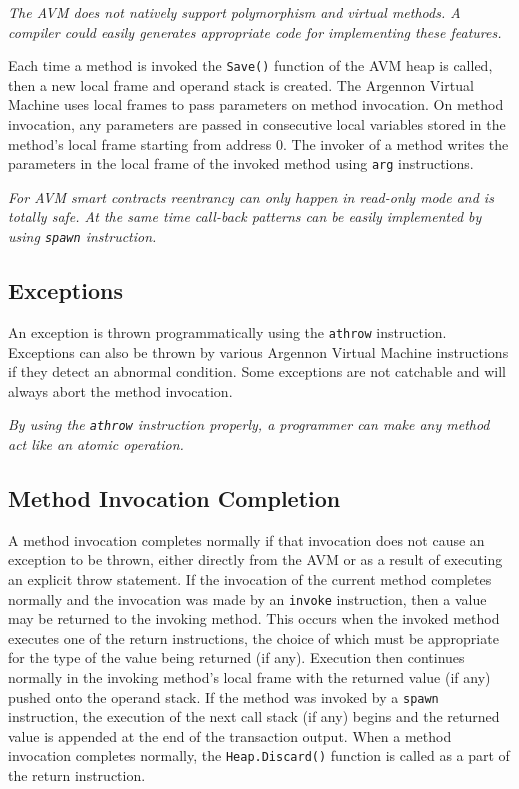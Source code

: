 \documentclass[11pt, a4paper]{report}
\newcommand{\note}[1] {
    \begin{tcolorbox}[colframe=white,colback=white]
        \emph{#1}
    \end{tcolorbox}
}
\begin{document}
    \note{The AVM does not natively support polymorphism and virtual methods. A compiler could easily
    generates appropriate code for implementing these features.}

    Each time a method is invoked the \texttt{Save()} function of the AVM heap is called, then a new local frame
    and operand stack is created. The Argennon Virtual Machine uses local frames to pass parameters on
    method invocation. On method invocation, any parameters are passed in consecutive local variables stored in the
    method's local frame starting from address 0. The invoker of a method writes the parameters in the local frame
    of the invoked method using \texttt{arg} instructions.

    \note{For AVM smart contracts \emph{reentrancy} can only happen in read-only mode and is totally safe.
    At the same time call-back patterns can be easily implemented by using \texttt{spawn} instruction.}

    \subsection{Exceptions}\label{subsec:exceptions}

    An exception is thrown programmatically using the \texttt{athrow} instruction. Exceptions can also be thrown by
    various Argennon Virtual Machine instructions if they detect an abnormal condition. Some exceptions are not
    catchable and will always abort the method invocation.

    \note{By using the \texttt{athrow} instruction properly, a programmer can make any method act like an atomic
    operation.}

    \subsection{Method Invocation Completion}\label{subsec:method-invocation-completion}

    A method invocation completes normally if that invocation does not cause an exception to be thrown, either
    directly from the AVM or as a result of executing an explicit throw statement. If the invocation of the current
    method completes normally and the invocation was made by an \texttt{invoke} instruction, then a value may be
    returned to the invoking method. This occurs when the invoked method executes one of the return instructions, the
    choice of which must be appropriate for the type of the value being returned (if any). Execution then continues
    normally in the invoking method's local frame with the returned
    value (if any) pushed onto the operand stack. If the method was invoked by a \texttt{spawn} instruction,
    the execution of the next call stack (if any) begins and the returned value
    is appended at the end of the transaction output. When a method invocation completes normally,
    the \texttt{Heap.Discard()} function is called as a part of the return instruction.
\end{document}
